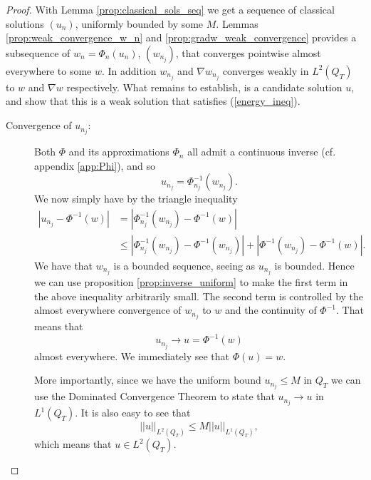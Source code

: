 \documentclass[11pt, a4paper]{article}
\begin{document}
\begin{proof}
With Lemma \ref{prop:classical_sols_seq} we get a sequence of classical solutions $(u_n)$, uniformly bounded by some $M$. Lemmas \ref{prop:weak_convergence_w_n} and \ref{prop:gradw_weak_convergence} provides a subsequence of $w_n = \Phi_n(u_n)$, $(w_{n_j})$, that converges pointwise almost everywhere to some $w$. In addition $w_{n_j}$ and $\nabla w_{n_j}$ converges weakly in $L^2(Q_T)$ to $w$ and $\nabla w$ respectively. What remains to establish, is a candidate solution $u$, and show that this is a weak solution that satisfies (\ref{energy_ineq}).

\begin{description}
	\item[Convergence of $u_{n_j}$:] Both $\Phi$ and its approximations $\Phi_n$ all admit a continuous inverse (cf. appendix \ref{app:Phi}), and so
	\begin{equation*}
	u_{n_j} = \Phi_{n_j}^{-1}(w_{n_j}).
	\end{equation*}
	We now simply have by the triangle inequality
	\begin{align*}
	|u_{n_j} - \Phi^{-1}(w)| &= |\Phi_{n_j}^{-1}(w_{n_j}) - \Phi^{-1}(w)| \\
		&\leq |\Phi_{n_j}^{-1}(w_{n_j}) - \Phi^{-1}(w_{n_j})| + |\Phi^{-1}(w_{n_j}) - \Phi^{-1}(w)|.
	\end{align*}
	 We have that $w_{n_j}$ is a bounded sequence, seeing as $u_{n_j}$ is bounded. Hence we can use proposition \ref{prop:inverse_uniform} to make the first term in the above inequality arbitrarily small. The second term is controlled by the almost everywhere convergence of $w_{n_j}$ to $w$ and the continuity of $\Phi^{-1}$. That means that
	 \begin{equation*}
	 u_{n_j} \to u = \Phi^{-1}(w)
	 \end{equation*}
	 almost everywhere. We immediately see that $\Phi(u) = w$.
	 
	 More importantly, since we have the uniform bound $u_{n_j} \leq M$ in $Q_T$ we can use the Dominated Convergence Theorem to state that $u_{n_j} \to u$ in $L^1(Q_T)$.
	 It is also easy to see that
	 \begin{equation}
	 ||u||_{L^2(Q_T)} \leq M||u||_{L^1(Q_T)},
	 \end{equation}
	 which means that $u \in L^2(Q_T)$.


\end{description}
\end{proof}
\end{document}
